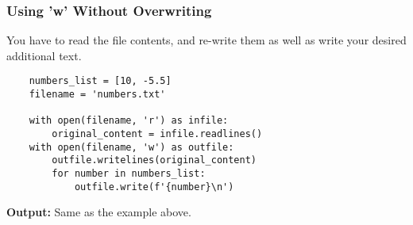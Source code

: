 \subsubsection{Using 'w' Without Overwriting}
You have to read the file contents, and re-write them as well as write your desired additional text.
\begin{verbatim}
    numbers_list = [10, -5.5]
    filename = 'numbers.txt'
    
    with open(filename, 'r') as infile:
        original_content = infile.readlines()
    with open(filename, 'w') as outfile:
        outfile.writelines(original_content)
        for number in numbers_list:
            outfile.write(f'{number}\n')
\end{verbatim}

\textbf{Output:} Same as the example above.

